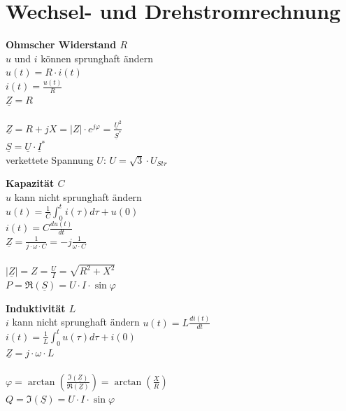 \section{Wechsel- und Drehstromrechnung}
\begin{multicols}{3}
	\textbf{Ohmscher Widerstand $R$} \\
	$u$ und $i$ können sprunghaft ändern \\
	$u(t) = R \cdot i(t)$ \\
	$i(t) = \frac{u(t)}{R}$ \\
	$\underline{Z} = R$ \\ \\
	$\underline{Z} = R + jX = \lvert Z \rvert \cdot e^{j\varphi} = \frac{\underline{U}^2}{\underline{S}^*}$ \\
	$\underline{S} = \underline{U} \cdot \underline{I}^*$\\
	verkettete Spannung $U$: $U = \sqrt{3} \cdot U_{Str}$
	
	\textbf{Kapazität $C$} \\
	$u$ kann nicht sprunghaft ändern \\
	$u(t) = \frac{1}{C} \int_{0}^{t} i(\tau) d\tau + u(0)$ \\
	$i(t) = C\frac{du(t)}{dt}$ \\
	$\underline{Z} = \frac{1}{j \cdot \omega \cdot C} = -j \frac{1}{\omega \cdot C}$ \\ \\
	$\lvert \underline{Z} \rvert = Z = \frac{U}{I} = \sqrt{R^2 + X^2}$ \\
	$P = \Re(\underline{S}) = U \cdot I \cdot \sin \varphi$
	
	\textbf{Induktivität $L$} \\
	$i$ kann nicht sprunghaft ändern
	$u(t) = L\frac{di(t)}{dt}$ \\
	$i(t) = \frac{1}{L} \int_{0}^{t} u(\tau) d\tau + i(0)$ \\
	$\underline{Z} = j \cdot \omega \cdot L$ \\ \\
	$\varphi = \arctan \left(\frac{\Im (\underline{Z})}{\Re (\underline{Z})}\right) = \arctan \left(\frac{X}{R}\right)$ \\
	$Q = \Im (\underline{S}) = U \cdot I \cdot \sin \varphi$
\end{multicols}

